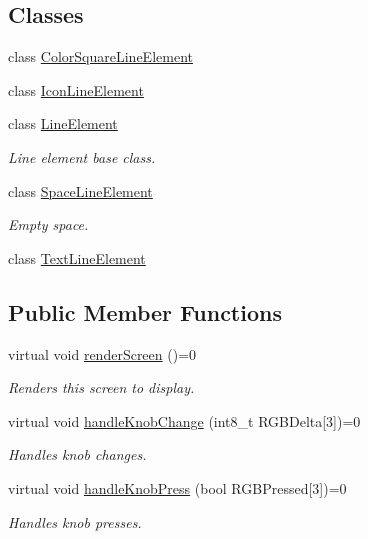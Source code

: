\subsection*{Classes}
\begin{DoxyCompactItemize}
\item 
class \mbox{\hyperlink{classScreen_1_1ColorSquareLineElement}{Color\+Square\+Line\+Element}}
\item 
class \mbox{\hyperlink{classScreen_1_1IconLineElement}{Icon\+Line\+Element}}
\item 
class \mbox{\hyperlink{classScreen_1_1LineElement}{Line\+Element}}
\begin{DoxyCompactList}\small\item\em Line element base class. \end{DoxyCompactList}\item 
class \mbox{\hyperlink{classScreen_1_1SpaceLineElement}{Space\+Line\+Element}}
\begin{DoxyCompactList}\small\item\em Empty space. \end{DoxyCompactList}\item 
class \mbox{\hyperlink{classScreen_1_1TextLineElement}{Text\+Line\+Element}}
\end{DoxyCompactItemize}
\subsection*{Public Member Functions}
\begin{DoxyCompactItemize}
\item 
\mbox{\label{classScreen_afd1cb4a4bfbbec56cc64c973a9242110}} 
virtual void \mbox{\hyperlink{classScreen_afd1cb4a4bfbbec56cc64c973a9242110}{render\+Screen}} ()=0
\begin{DoxyCompactList}\small\item\em Renders this screen to display. \end{DoxyCompactList}\item 
\mbox{\label{classScreen_a4c3869a19704ec2530a377618b3f6104}} 
virtual void \mbox{\hyperlink{classScreen_a4c3869a19704ec2530a377618b3f6104}{handle\+Knob\+Change}} (int8\+\_\+t R\+G\+B\+Delta\mbox{[}3\mbox{]})=0
\begin{DoxyCompactList}\small\item\em Handles knob changes. \end{DoxyCompactList}\item 
\mbox{\label{classScreen_a1b9547f8f48c3ceae2024b58e0746e94}} 
virtual void \mbox{\hyperlink{classScreen_a1b9547f8f48c3ceae2024b58e0746e94}{handle\+Knob\+Press}} (bool R\+G\+B\+Pressed\mbox{[}3\mbox{]})=0
\begin{DoxyCompactList}\small\item\em Handles knob presses. \end{DoxyCompactList}\end{DoxyCompactItemize}

